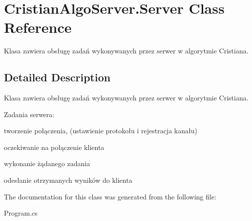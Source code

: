 \hypertarget{class_cristian_algo_server_1_1_server}{\section{Cristian\+Algo\+Server.\+Server Class Reference}
\label{class_cristian_algo_server_1_1_server}
}


Klasa zawiera obsługę zadań wykonywanych przez serwer w algorytmie Cristiana.  




\subsection{Detailed Description}
Klasa zawiera obsługę zadań wykonywanych przez serwer w algorytmie Cristiana. 

Zadania serwera\+:
\begin{DoxyItemize}
\item tworzenie połączenia, (ustawienie protokołu i rejestracja kanału)
\item oczekiwanie na połączenie klienta
\item wykonanie żądanego zadania
\item odesłanie otrzymanych wyników do klienta 
\end{DoxyItemize}

The documentation for this class was generated from the following file\+:\begin{DoxyCompactItemize}
\item 
Program.\+cs\end{DoxyCompactItemize}

